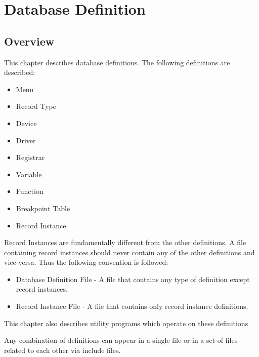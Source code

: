 \chapter{Database Definition}

\section{Overview}

This chapter describes database definitions. The following definitions are described:

\begin{itemize}\item Menu

\item Record Type

\item Device

\item Driver

\item Registrar

\item Variable

\item Function

\item Breakpoint Table

\item Record Instance

\end{itemize}Record Instances are fundamentally different from the other definitions. A file containing record instances should never 
contain any of the other definitions and vice-versa. Thus the following convention is followed:

\begin{itemize}\item {}Database Definition File - A file that contains any type of definition except record instances.

\item {}Record Instance File - A file that contains only record instance definitions.

\end{itemize}This chapter also describes utility programs which operate on these definitions

Any combination of definitions can appear in a single file or in a set of files related to each other via include files.

